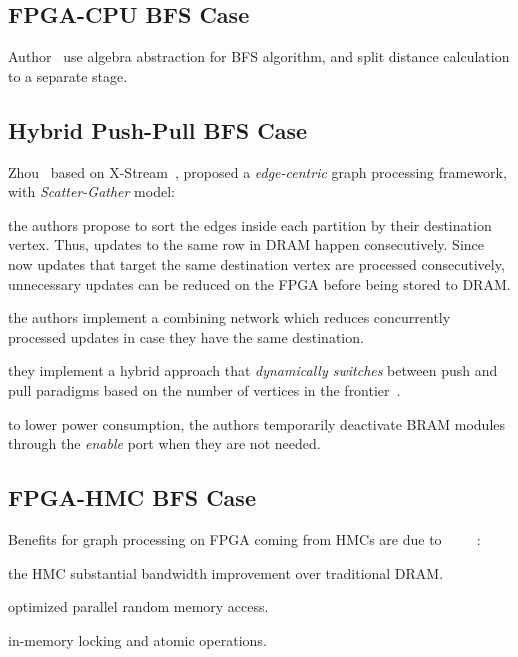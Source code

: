 \documentclass[UTF8,12pt,a4paper]{article}
\begin{document}
\subsection{FPGA-CPU BFS Case}
Author~\cite{DBLP:conf/fpl/UmurogluMJ15}
use algebra abstraction for BFS algorithm,
and split distance calculation to a separate stage.

\subsection{Hybrid Push-Pull BFS Case}
Zhou~\cite{DBLP:conf/fccm/ZhouCP16} based on X-Stream~\cite{DBLP:conf/sosp/RoyMZ13},
proposed a \textit{edge-centric} graph processing framework,
with \textit{Scatter-Gather} model:
\begin{compactitem}
  \item the authors propose to sort the edges inside each partition by their destination vertex.
  Thus, updates to the same row in DRAM happen consecutively.
  Since now updates that target the same destination vertex are processed consecutively,
  unnecessary updates can be reduced on the FPGA before being stored to DRAM.
  \item the authors implement a combining network which reduces concurrently processed updates
  in case they have the same destination.
  \item they implement a hybrid approach that \textit{dynamically switches}
  between push and pull paradigms based on the number of vertices in the frontier~\cite{DBLP:conf/sbac-pad/ZhouP17}.
  \item to lower power consumption, the authors temporarily deactivate BRAM modules
  through the \textit{enable} port when they are not needed.
\end{compactitem}

\subsection{FPGA-HMC BFS Case}
Benefits for graph processing on FPGA coming from HMCs are due to
~\cite{DBLP:conf/fpga/ZhangKL17}
~\cite{DBLP:conf/fpga/ZhangL18}
~\cite{DBLP:conf/fpga/KhoramZSL18}:
\begin{compactitem}
  \item the HMC substantial bandwidth improvement over traditional DRAM.
  \item optimized parallel random memory access.
  \item in-memory locking and atomic operations.
\end{compactitem}
\end{document}

